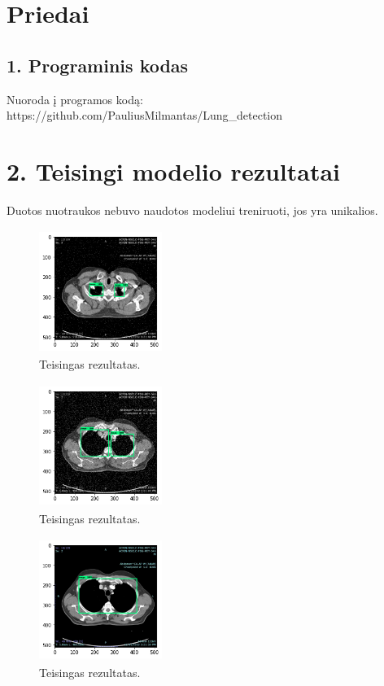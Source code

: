 \documentclass{VUMIFInfKursinis}
\begin{document}
\printbibliography[heading=bibintoc]

\section*{Priedai}
\subsection*{1. Programinis kodas}
Nuoroda į programos kodą: https://github.com/PauliusMilmantas/Lung\_detection
\section*{2. Teisingi modelio rezultatai}
\par
Duotos nuotraukos nebuvo naudotos modeliui treniruoti, jos yra unikalios.
\item 
\begin{figure}[ht]
  \centering
  \includegraphics[width=4cm,height=4cm,keepaspectratio]{duom1.png}
  \caption{Teisingas rezultatas.}
  \label{fig:kaukė1}
\end{figure} 

\begin{figure}[ht]
  \centering
  \includegraphics[width=4cm,height=4cm,keepaspectratio]{duom2.png}
  \caption{Teisingas rezultatas.}
  \label{fig:kaukė1}
\end{figure} 
 
\begin{figure}[ht]
  \centering
  \includegraphics[width=4cm,height=4cm,keepaspectratio]{duom3.png}
  \caption{Teisingas rezultatas.}
  \label{fig:kaukė1}
\end{figure} 
\end{document}
